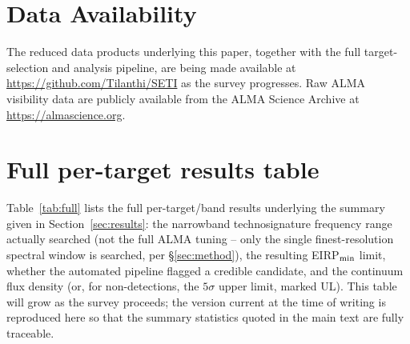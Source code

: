 \documentclass{openjournal}
\begin{document}
\section*{Data Availability}
The reduced data products underlying this paper, together with the full
target-selection and analysis pipeline, are being made available at
\url{https://github.com/Tilanthi/SETI} as the survey progresses. Raw ALMA
visibility data are publicly available from the ALMA Science Archive at
\url{https://almascience.org}.


\appendix
\section{Full per-target results table}
\label{app:table}

Table~\ref{tab:full} lists the full per-target/band results underlying the
summary given in Section~\ref{sec:results}: the narrowband technosignature
frequency range actually searched (not the full ALMA tuning -- only the
single finest-resolution spectral window is searched, per
\S\ref{sec:method}), the resulting EIRP$_{\rm min}$ limit, whether the
automated pipeline flagged a credible candidate, and the continuum flux
density (or, for non-detections, the $5\sigma$ upper limit, marked UL).
This table will grow as the survey proceeds; the version current at the
time of writing is reproduced here so that the summary statistics quoted
in the main text are fully traceable.
\end{document}
